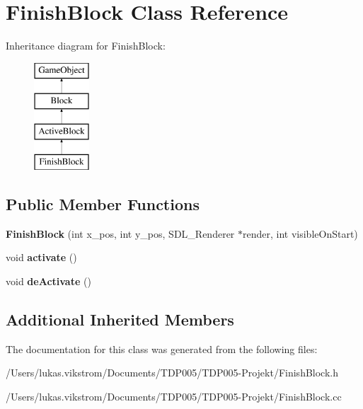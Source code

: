 \hypertarget{class_finish_block}{}\section{Finish\+Block Class Reference}
\label{class_finish_block}
Inheritance diagram for Finish\+Block\+:\begin{figure}[H]
\begin{center}
\leavevmode
\includegraphics[height=4.000000cm]{class_finish_block}
\end{center}
\end{figure}
\subsection*{Public Member Functions}
\begin{DoxyCompactItemize}
\item 
\hypertarget{class_finish_block_a98778169bc154ec4f534f67b2424ba95}{}{\bfseries Finish\+Block} (int x\+\_\+pos, int y\+\_\+pos, S\+D\+L\+\_\+\+Renderer $\ast$render, int visible\+On\+Start)\label{class_finish_block_a98778169bc154ec4f534f67b2424ba95}

\item 
\hypertarget{class_finish_block_a8309ee02694113a7b2f7bcc9123009aa}{}void {\bfseries activate} ()\label{class_finish_block_a8309ee02694113a7b2f7bcc9123009aa}

\item 
\hypertarget{class_finish_block_a530bc99f20b0763aa56532b7307aecf9}{}void {\bfseries de\+Activate} ()\label{class_finish_block_a530bc99f20b0763aa56532b7307aecf9}

\end{DoxyCompactItemize}
\subsection*{Additional Inherited Members}


The documentation for this class was generated from the following files\+:\begin{DoxyCompactItemize}
\item 
/\+Users/lukas.\+vikstrom/\+Documents/\+T\+D\+P005/\+T\+D\+P005-\/\+Projekt/Finish\+Block.\+h\item 
/\+Users/lukas.\+vikstrom/\+Documents/\+T\+D\+P005/\+T\+D\+P005-\/\+Projekt/Finish\+Block.\+cc\end{DoxyCompactItemize}
